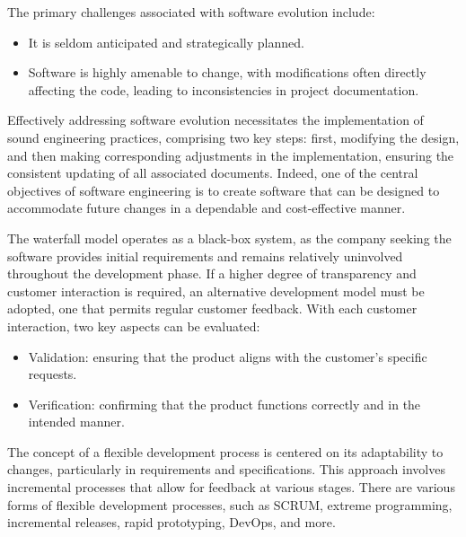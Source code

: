 The primary challenges associated with software evolution include:
\begin{itemize}
    \item It is seldom anticipated and strategically planned.
    \item Software is highly amenable to change, with modifications often directly affecting the code, leading to inconsistencies in project documentation.
\end{itemize}
Effectively addressing software evolution necessitates the implementation of sound engineering practices, comprising two key steps: first, modifying the design, and then making corresponding adjustments in the implementation, ensuring the consistent updating of all associated documents.
Indeed, one of the central objectives of software engineering is to create software that can be designed to accommodate future changes in a dependable and cost-effective manner.

The waterfall model operates as a black-box system, as the company seeking the software provides initial requirements and remains relatively uninvolved throughout the development phase. 
If a higher degree of transparency and customer interaction is required, an alternative development model must be adopted, one that permits regular customer feedback. With each customer interaction, two key aspects can be evaluated:
\begin{itemize}
    \item Validation: ensuring that the product aligns with the customer's specific requests.
    \item Verification: confirming that the product functions correctly and in the intended manner.
\end{itemize}
The concept of a flexible development process is centered on its adaptability to changes, particularly in requirements and specifications.
This approach involves incremental processes that allow for feedback at various stages.
There are various forms of flexible development processes, such as SCRUM, extreme programming, incremental releases, rapid prototyping, DevOps, and more.